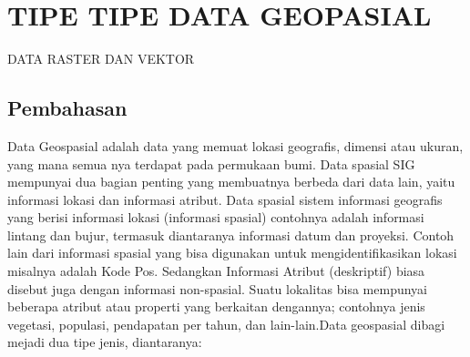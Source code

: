 \section{TIPE TIPE DATA GEOPASIAL}
DATA RASTER DAN VEKTOR
\subsection{Pembahasan}
Data Geospasial adalah data yang memuat lokasi geografis, dimensi atau ukuran, yang mana semua nya terdapat pada permukaan bumi. Data spasial SIG mempunyai dua bagian penting yang membuatnya berbeda dari data lain, yaitu informasi lokasi dan informasi atribut. Data spasial sistem informasi geografis yang berisi informasi lokasi (informasi spasial) contohnya adalah informasi lintang dan bujur, termasuk diantaranya informasi datum dan proyeksi. Contoh lain dari informasi spasial yang bisa digunakan untuk mengidentifikasikan lokasi misalnya adalah Kode Pos. Sedangkan Informasi Atribut (deskriptif) biasa disebut juga dengan informasi non-spasial. Suatu lokalitas bisa mempunyai beberapa atribut atau properti yang berkaitan dengannya; contohnya jenis vegetasi, populasi, pendapatan per tahun, dan lain-lain.Data geospasial dibagi mejadi dua tipe jenis, diantaranya:

